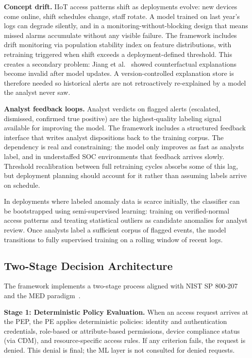 \documentclass[conference]{IEEEtran}
\begin{document}
\textbf{Concept drift.} IIoT access patterns shift as deployments evolve: new devices come online, shift schedules change, staff rotate. A model trained on last year's logs can degrade silently, and in a monitoring-without-blocking design that means missed alarms accumulate without any visible failure. The framework includes drift monitoring via population stability index on feature distributions, with retraining triggered when shift exceeds a deployment-defined threshold. This creates a secondary problem: Jiang et al.~\cite{jiang2024} showed counterfactual explanations become invalid after model updates. A version-controlled explanation store is therefore needed so historical alerts are not retroactively re-explained by a model the analyst never saw.

\textbf{Analyst feedback loops.} Analyst verdicts on flagged alerts (escalated, dismissed, confirmed true positive) are the highest-quality labeling signal available for improving the model. The framework includes a structured feedback interface that writes analyst dispositions back to the training corpus. The dependency is real and constraining: the model only improves as fast as analysts label, and in understaffed SOC environments that feedback arrives slowly. Threshold recalibration between full retraining cycles absorbs some of this lag, but deployment planning should account for it rather than assuming labels arrive on schedule.

In deployments where labeled anomaly data is scarce initially, the classifier can be bootstrapped using semi-supervised learning: training on verified-normal access patterns and treating statistical outliers as candidate anomalies for analyst review. Once analysts label a sufficient corpus of flagged events, the model transitions to fully supervised training on a rolling window of recent logs.

\subsection{Two-Stage Decision Architecture}

The framework implements a two-stage process aligned with NIST SP 800-207 and the MED paradigm~\cite{ramezanpour2022}.

\textbf{Stage 1: Deterministic Policy Evaluation.} When an access request arrives at the PEP, the PE applies deterministic policies: identity and authentication credentials, role-based or attribute-based permissions, device compliance status (via CDM), and resource-specific access rules. If any criterion fails, the request is denied. This denial is final; the ML layer is not consulted for denied requests.
\end{document}
